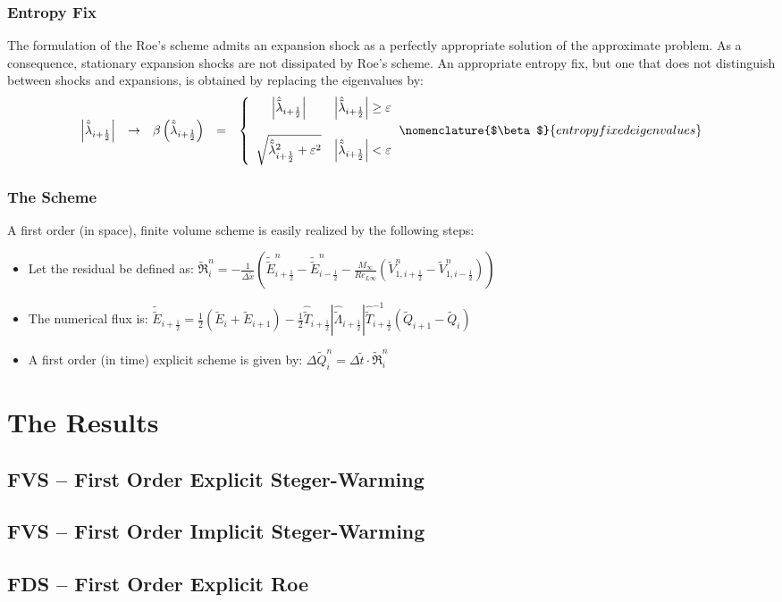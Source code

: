 \documentclass[11pt, a4paper]{article}
\begin{document}
\subsubsection{Entropy Fix}
The formulation of the Roe's scheme admits an expansion shock as a perfectly appropriate solution of the approximate problem. As a consequence, stationary expansion shocks are not dissipated by Roe's scheme. An appropriate entropy fix, but one that does not distinguish between shocks and expansions, is obtained by replacing the eigenvalues by:
\begin{equation}
    \begin{matrix}
        \left|\hat{\tilde{\lambda}}_{i+\frac{1}{2}}\right| & \rightarrow & \beta\left(\hat{\tilde{\lambda}}_{i+\frac{1}{2}}\right) & = & \left\{\begin{array}{cc}
            \left|\hat{\tilde{\lambda}}_{i+\frac{1}{2}}\right| & \left|\hat{\tilde{\lambda}}_{i+\frac{1}{2}}\right|\ge\varepsilon \\\\
            \sqrt{\hat{\tilde{\lambda}}_{i+\frac{1}{2}}^2+\varepsilon^2} & \left|\hat{\tilde{\lambda}}_{i+\frac{1}{2}}\right|<\varepsilon
        \end{array}\right.
    \end{matrix}
    \nomenclature{$\beta$}{entropy fixed eigenvalues}
\end{equation}

\subsubsection{The Scheme}
A first order (in space), finite volume scheme is easily realized by the following steps:
\begin{itemize}
    \item Let the residual be defined as: $\displaystyle\tilde{\mathfrak{R}}_i^n=-\frac{1}{\Delta\tilde{x}}\left(\tilde{\tilde{E}}_{i+\frac{1}{2}}^n-\tilde{\tilde{E}}_{i-\frac{1}{2}}^n-\frac{M_\infty}{Re_{L\infty}}\left(\tilde{V}_{1,i+\frac{1}{2}}^{n}-\tilde{V}_{1,i-\frac{1}{2}}^{n}\right)\right)$
    \item The numerical flux is: $\displaystyle\tilde{\tilde{E}}_{i+\frac{1}{2}}=\frac{1}{2}\left(\tilde{E}_{i}+\tilde{E}_{i+1}\right)-\frac{1}{2}\hat{\tilde{T}}_{i+\frac{1}{2}}\left|\hat{\tilde{\Lambda}}_{i+\frac{1}{2}}\right|\hat{\tilde{T}}^{-1}_{i+\frac{1}{2}}\left(\tilde{Q}_{i+1}-\tilde{Q}_{i}\right)$
    \item A first order (in time) explicit scheme is given by: $\Delta\tilde{Q}_i^n=\Delta\tilde{t}\cdot\tilde{\mathfrak{R}}_i^n$
\end{itemize}

\section{The Results}
\subsection{FVS -- First Order Explicit Steger-Warming}
\subsection{FVS -- First Order Implicit Steger-Warming}
\subsection{FDS -- First Order Explicit Roe}
\end{document}
